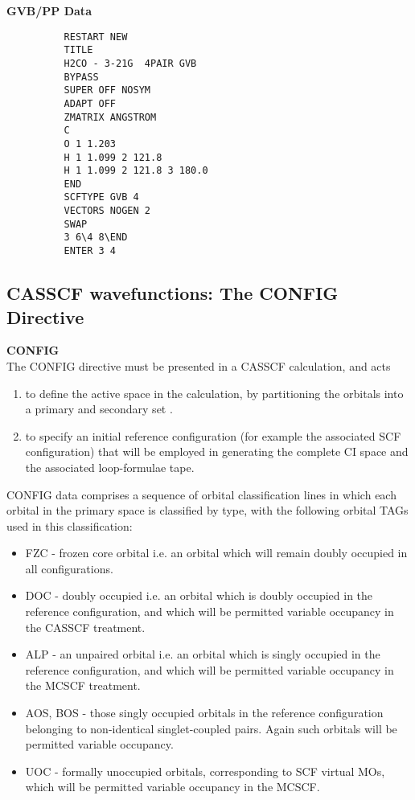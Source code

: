 \documentclass[11pt,fleqn]{article}
\begin{document}
{\bf GVB/PP Data}
{
\footnotesize
\begin{verbatim}
          RESTART NEW
          TITLE
          H2CO - 3-21G  4PAIR GVB
          BYPASS
          SUPER OFF NOSYM
          ADAPT OFF
          ZMATRIX ANGSTROM
          C
          O 1 1.203
          H 1 1.099 2 121.8
          H 1 1.099 2 121.8 3 180.0
          END
          SCFTYPE GVB 4
          VECTORS NOGEN 2
          SWAP
          3 6\4 8\END
          ENTER 3 4
\end{verbatim}
}


\subsection[CASSCF wavefunctions: The CONFIG Directive]{CASSCF wavefunctions: The CONFIG Directive}

{\bf CONFIG}\\

The CONFIG directive must be presented in a CASSCF calculation, and acts

\begin{enumerate}
\item  to define the active space in the  calculation, by partitioning
the orbitals into a primary and secondary set  \cite{roos}.
\item  to specify an initial reference configuration (for example
the associated SCF configuration) that will be employed in
generating the complete CI space and the associated loop-formulae
tape.
\end{enumerate}

CONFIG data comprises a sequence of orbital classification lines
in which each orbital in the primary space is classified
by type, with the following orbital TAGs used in this
classification:


\begin{itemize}
\item  FZC - frozen core orbital i.e. an orbital which will remain
doubly occupied in all configurations.

\item DOC - doubly occupied i.e. an orbital which is doubly occupied in
the reference configuration, and which  will be permitted
variable occupancy in the CASSCF treatment.

\item  ALP - an unpaired orbital i.e. an orbital which is singly occupied
in the reference configuration, and which will be permitted
variable occupancy in the MCSCF treatment.

\item AOS, BOS - those singly occupied orbitals in the reference
configuration belonging to non-identical singlet-coupled pairs.
Again such orbitals will be permitted variable occupancy.

\item UOC - formally unoccupied orbitals, corresponding to SCF virtual
MOs, which will be permitted variable occupancy in the MCSCF.
\end{itemize}
\end{document}
